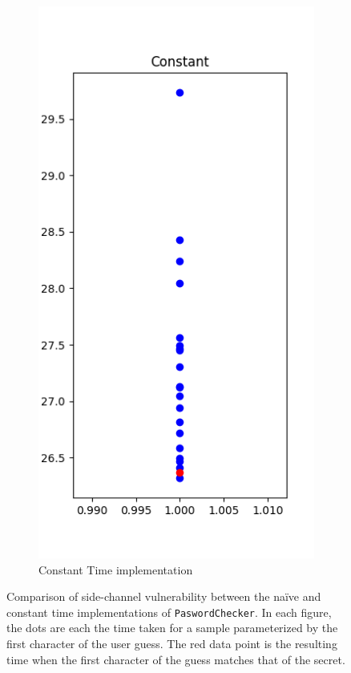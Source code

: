 \begin{figure}[h]
\begin{subfigure}{.5\textwidth}
  \includegraphics[width=.7\linewidth]{figures/constant0.png}
  \caption{Constant Time implementation}
  \label{fig:sub2}
\end{subfigure}
\caption{Comparison of side-channel vulnerability between the na\"ive and constant time implementations of \texttt{PaswordChecker}. In each figure, the dots are each the time taken for a sample parameterized by the first character of the user guess. The red data point is the resulting time when the first character of the guess matches that of the secret.}
\label{fig:test}
\end{figure}

